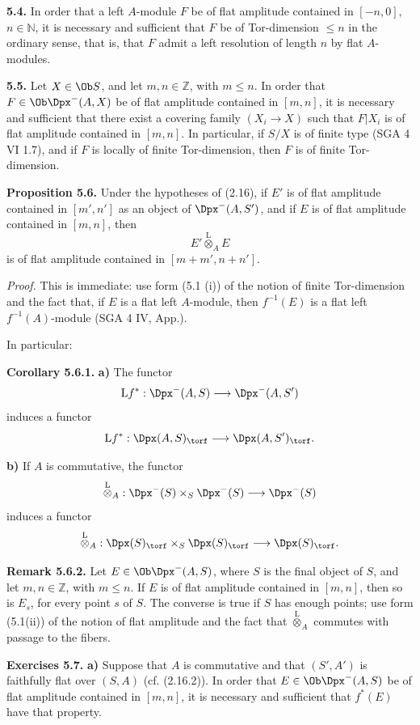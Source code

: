 \documentclass[11pt]{article}
\begin{document}
\textbf{5.4.} In order that a left \(A\)-module \(F\) be of flat amplitude contained in \([-n,0]\), \(n\in\mathbb N\), it is necessary and sufficient that \(F\) be of Tor-dimension \(\leq n\) in the ordinary sense, that is, that \(F\) admit a left resolution of length \(n\) by flat \(A\)-modules.

\textbf{5.5.} Let \(X\in\Ob S\), and let \(m,n\in\mathbb Z\), with \(m\leq n\). In order that \(F\in\Ob\Dpx^-(A,X)\) be of flat amplitude contained in \([m,n]\), it is necessary and sufficient that there exist a covering family \((X_i\to X)\) such that \(F|X_i\) is of flat amplitude contained in \([m,n]\). In particular, if \(S/X\) is of finite type (SGA 4 VI 1.7), and if \(F\) is locally of finite Tor-dimension, then \(F\) is of finite Tor-dimension.

\textbf{Proposition 5.6.} Under the hypotheses of (2.16), if \(E'\) is of flat amplitude contained in \([m',n']\) as an object of \(\Dpx^-(A,S')\), and if \(E\) is of flat amplitude contained in \([m,n]\), then
\[
  E'\overset{\mathrm L}{\otimes}_A E
\]
is of flat amplitude contained in \([m+m',n+n']\).

\emph{Proof.} This is immediate: use form (5.1 (i)) of the notion of finite Tor-dimension and the fact that, if \(E\) is a flat left \(A\)-module, then \(f^{-1}(E)\) is a flat left \(f^{-1}(A)\)-module (SGA 4 IV, App.).

In particular:

\textbf{Corollary 5.6.1.} \textbf{a)} The functor
\[
  \mathrm L f^*:\Dpx^-(A,S)\longrightarrow \Dpx^-(A,S')
\]
induces a functor
\[
  \mathrm L f^*:\Dpx(A,S)_{\torf}\longrightarrow \Dpx(A,S')_{\torf}.
\]

\textbf{b)} If \(A\) is commutative, the functor
\[
  \overset{\mathrm L}{\otimes}_A:
  \Dpx^-(S)\times_S\Dpx^-(S)\longrightarrow \Dpx^-(S)
\]
induces a functor
\[
  \overset{\mathrm L}{\otimes}_A:
  \Dpx(S)_{\torf}\times_S\Dpx(S)_{\torf}
  \longrightarrow \Dpx(S)_{\torf}.
\]

\textbf{Remark 5.6.2.} Let \(E\in\Ob\Dpx^-(A,S)\), where \(S\) is the final object of \(S\), and let \(m,n\in\mathbb Z\), with \(m\leq n\). If \(E\) is of flat amplitude contained in \([m,n]\), then so is \(E_s\), for every point \(s\) of \(S\). The converse is true if \(S\) has enough points; use form (5.1(ii)) of the notion of flat amplitude and the fact that \(\overset{\mathrm L}{\otimes}_A\) commutes with passage to the fibers.

\textbf{Exercises 5.7.} \textbf{a)} Suppose that \(A\) is commutative and that \((S',A')\) is faithfully flat over \((S,A)\) (cf. (2.16.2)). In order that \(E\in\Ob\Dpx^-(A,S)\) be of flat amplitude contained in \([m,n]\), it is necessary and sufficient that \(f^*(E)\) have that property.
\end{document}
